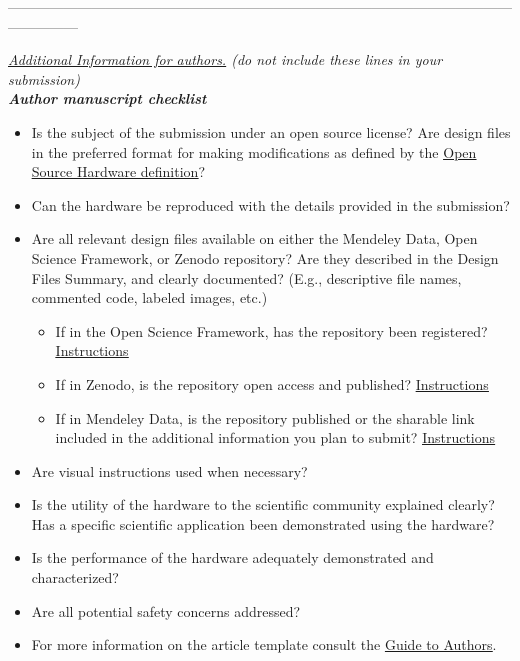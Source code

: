 \documentclass[11pt, letterpaper]{article}
\begin{document}
\begin{center}
  ---------------------------------------------------------------------------------------------------------------------------
\end{center}
{\it \underline{Additional Information for authors.} (do not include these lines in your submission)\\

\noindent
\textbf{Author manuscript checklist}
\begin{itemize}
  \item[$\bullet$]Is the subject of the submission under an open source license? Are design files in the preferred format for making modifications as defined by the \href{http://www.oshwa.org/definition/}{\underline{Open Source Hardware definition}}?

  \item[$\bullet$]Can the hardware be reproduced with the details provided in the submission?

  \item[$\bullet$]Are all relevant design files available on either the Mendeley Data, Open Science Framework, or Zenodo repository? Are they described in the Design Files Summary, and clearly documented? (E.g., descriptive file names, commented code, labeled images, etc.)
        \begin{itemize}
          \item[$\circ$]If in the Open Science Framework, has the repository been registered? \href{https://osf.io/wgk7q/wiki/home/}{\underline{Instructions}}
          \item[$\circ$]If in Zenodo, is the repository open access and published? \href{https://doi.org/10.5281/zenodo.3346799}{\underline{Instructions}}
          \item[$\circ$]If in Mendeley Data, is the repository published or the sharable link included in the additional information you plan to submit? \href{https://doi.org/10.5281/zenodo.3346799}{\underline{Instructions}}
        \end{itemize}
  \item[$\bullet$]Are visual instructions used when necessary?

  \item[$\bullet$]Is the utility of the hardware to the scientific community explained clearly? Has a specific scientific application been demonstrated using the hardware?

  \item[$\bullet$]Is the performance of the hardware adequately demonstrated and characterized?

  \item[$\bullet$]Are all potential safety concerns addressed?

  \item[$\bullet$]For more information on the article template consult the \href{https://www.elsevier.com/journals/hardwarex/2468-0672/guide-for-authors}{\underline{Guide to Authors}}.
\end{itemize}}
\end{document}
